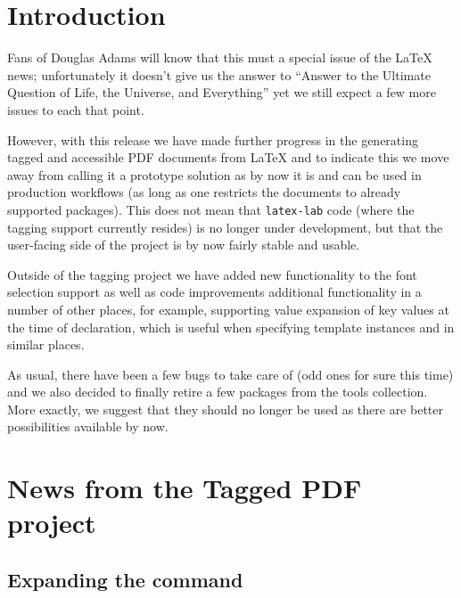 \documentclass{ltnews}
\providecommand\Dash {\unskip \textemdash}
\begin{document}
\maketitle
{  \spaceskip=3.33pt 
\tableofcontents}

\setlength{}

\medskip

\section{Introduction}

Fans of Douglas Adams will know that this must a special issue of the
\LaTeX{} news; unfortunately it doesn't give us the answer to
\enquote{Answer to the Ultimate Question of Life, the Universe, and
  Everything} yet \Dash we still expect a few more issues to each that
point.

However, with this release we have made further progress in the
generating tagged and accessible PDF documents from \LaTeX{} and to
indicate this we move away from calling it a prototype solution as by
now it is and can be used in production workflows (as long as one
restricts the documents to already supported packages). This does not
mean that \texttt{latex-lab} code (where the tagging support currently
resides) is no longer under development, but that the user-facing side
of the project is by now fairly stable and usable.

Outside of the tagging project we have added new functionality to the
font selection support as well as code improvements additional
functionality in a number of other places, for example, supporting
value expansion of key values at the time of declaration, which is
useful when specifying template instances and in similar places.

As usual, there have been a few bugs to take care of (odd ones for
sure this time) and we also decided to finally retire a few packages
from the tools collection. More exactly, we suggest that they should no
longer be used as there are better possibilities available by now.


\section{News from the Tagged PDF project}

\subsection{Expanding the  command}
\end{document}
